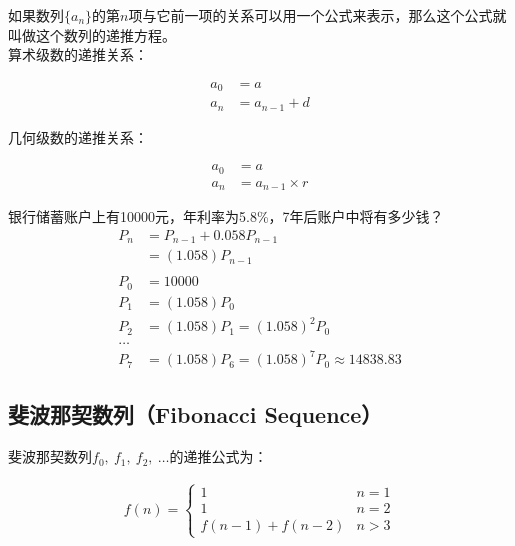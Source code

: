 \documentclass[12pt, openany, oneside]{book}
\begin{document}
如果数列$ \{a_n\} $的第$ n $项与它前一项的关系可以用一个公式来表示，那么这个公式就叫做这个数列的递推方程。 \\

算术级数的递推关系：

\vspace{-1cm}
\begin{align}
	\nonumber
	a_0 & = a           \\
	\nonumber
	a_n & = a_{n-1} + d
\end{align}

几何级数的递推关系：

\vspace{-1cm}
\begin{align}
	\nonumber
	a_0 & = a                \\
	\nonumber
	a_n & = a_{n-1} \times r
\end{align}

\begin{tcolorbox}\nonumber
	银行储蓄账户上有10000元，年利率为5.8\%，7年后账户中将有多少钱？
	\begin{align}
		P_n & = P_{n-1} + 0.058P_{n-1}                      \\
		    & = (1.058)P_{n-1}                              \\
		\\
		P_0 & = 10000                                       \\
		P_1 & = (1.058)P_0                                  \\
		P_2 & = (1.058)P_1 = (1.058)^2 P_0                  \\
		\dots                                               \\
		P_7 & = (1.058)P_6 = (1.058)^7 P_0 \approx 14838.83
	\end{align}
\end{tcolorbox}

\subsection{斐波那契数列（Fibonacci Sequence）}

斐波那契数列$ f_0,\ f_1,\ f_2,\ \dots $的递推公式为：

\begin{align}\nonumber
	f(n) = \begin{cases}
		1               & n = 1 \\
		1               & n = 2 \\
		f(n-1) + f(n-2) & n > 3
	\end{cases}
\end{align}
\end{document}
